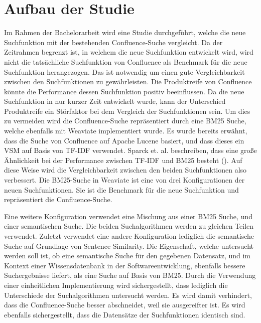 \section{Aufbau der Studie}
Im Rahmen der Bachelorarbeit wird eine Studie durchgeführt, welche die neue Suchfunktion mit der bestehenden Confluence-Suche vergleicht.
Da der Zeitrahmen begrenzt ist, in welchem die neue Suchfunktion entwickelt wird, wird nicht die tatsächliche Suchfunktion von Confluence als Benchmark für die neue Suchfunktion herangezogen.
Das ist notwendig um einen gute Vergleichbarkeit zwischen den Suchfunktionen zu gewährleisten.
Die Produktreife von Confluence könnte die Performance dessen Suchfunktion positiv beeinflussen.
Da die neue Suchfunktion in nur kurzer Zeit entwickelt wurde, kann der Unterschied Produktreife ein Störfaktor bei dem Vergleich der Suchfunktionen sein.
Um dies zu vermeiden wird die Confluence-Suche repräsentiert durch eine BM25 Suche, welche ebenfalls mit Weaviate implementiert wurde. 
Es wurde bereits erwähnt, dass die Suche von Confluence auf Apache Lucene basiert, und dass dieses ein VSM auf Basis von TF-IDF verwendet.
Sparck et. al. beschreiben, dass eine große Ähnlichkeit bei der Performance zwischen TF-IDF und BM25 besteht (\cite{Sparck_Jones_Walker_Robertson_2000}).
Auf diese Weise wird die Vergleichbarkeit zwischen den beiden Suchfunktionen also verbessert.
Die BM25-Suche in Weaviate ist eine von drei Konfigurationen der neuen Suchfunktionen.
Sie ist die Benchmark für die neue Suchfunktion und repräsentiert die Confluence-Suche.

Eine weitere Konfiguration verwendet eine Mischung aus einer BM25 Suche, und einer semantischen Suche.
Die beiden Suchalgorithmen werden zu gleichen Teilen verwendet.
Zuletzt verwendet eine andere Konfiguration lediglich die semantische Suche auf Grundlage von Sentence Similarity.
Die Eigenschaft, welche untersucht werden soll ist, ob eine semantische Suche für den gegebenen Datensatz, und im Kontext einer Wissensdatenbank in der Softwareentwicklung, ebenfalls bessere Suchergebnisse liefert, als eine Suche auf Basis von BM25.
Durch die Verwendung einer einheitlichen Implementierung wird sichergestellt, dass lediglich die Unterschiede der Suchalgorithmen untersucht werden.
Es wird damit verhindert, dass die Confluence-Suche besser abschneidet, weil sie ausgereifter ist.
Es wird ebenfalls sichergestellt, dass die Datensätze der Suchfunktionen identisch sind.\\

